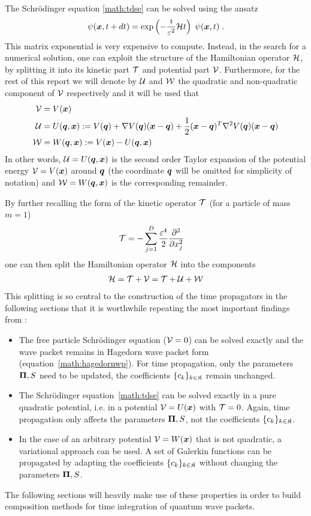 \par\medskip
%
The Schrödinger equation \ref{math:tdse} can be solved using the ansatz
\begin{align}
	\psi (\bm{x},t+dt) = \exp \left( - \frac{\imath}{\varepsilon^2} \mathcal{H} t \right) \; \psi (\bm{x},t) \; .
\end{align}
%
This matrix exponential is very expensive to compute.
Instead, in the search for a numerical solution, one can exploit the structure of the Hamiltonian operator $\mathcal{H}$, by splitting it into its kinetic part $\mathcal{T}$ and potential part $\mathcal{V}$.
Furthermore, for the rest of this report we will denote by $\mathcal{U}$ and $\mathcal{W}$ the quadratic and non-quadratic component of $\mathcal{V}$ respectively and it will be used that
%
\begin{align}
	\mathcal{V} &= V(\bm{x}) \\ 
	\mathcal{U} &= U(\bm{q},\bm{x}) := V(\bm{q}) + \nabla V(\bm{q}) (\bm{x}-\bm{q})
	+ \frac{1}{2} (\bm{x}-\bm{q})^T \nabla^2 V(\bm{q}) (\bm{x}-\bm{q}) \\
	\mathcal{W} &= W(\bm{q},\bm{x}) := V(\bm{x}) - U(\bm{q},\bm{x})
\end{align}
%
In other words, $\mathcal{U} = U(\bm{q},\bm{x})$ is the second order Taylor expansion of the potential energy $\mathcal{V} = V(\bm{x})$ around $\bm{q}$ (the coordinate $\bm{q}$ will be omitted for simplicity of notation) and $\mathcal{W} = W(\bm{q},\bm{x})$ is the corresponding remainder.
\par\medskip
%
By further recalling the form of the kinetic operator $\mathcal{T}$ (for a particle of mass $m=1$)
\begin{align}
	\mathcal{T} &= - \sum_{j=1}^D \frac{\varepsilon^4}{2} \frac{\partial^2}{\partial x_j^2}
\end{align}
%
one can then split the Hamiltonian operator $\mathcal{H}$ into the components
%
\begin{align}
	\mathcal{H} = \mathcal{T} + \mathcal{V} = \mathcal{T} + \mathcal{U} + \mathcal{W}
\end{align}
%
This splitting is so central to the construction of the time propagators in the following sections that it is worthwhile repeating the most important findings from \cite{FGL_semiclassical_dynamics}:
\begin{itemize}
	\item The free particle Schrödinger equation ($\mathcal{V}=0$) can be solved exactly and the wave packet remains in Hagedorn wave packet form (equation~\ref{math:hagedornwp}).
		For time propagation, only the parameters $\bm{\Pi},S$ need to be updated, the coefficients $\{c_k\}_{k \in \mathfrak{K}}$ remain unchanged.
	\item The Schrödinger equation~\ref{math:tdse} can be solved exactly in a pure quadratic potential, i.e. in a potential $\mathcal{V}=U(\bm{x})$ with $\mathcal{T}=0$.
		Again, time propagation only affects the parameters $\bm{\Pi},S$, not the coefficients $\{c_k\}_{k \in \mathfrak{K}}$.
	\item In the case of an arbitrary potential $\mathcal{V} = W(\bm{x})$ that is not quadratic, a variational approach can be used.
		A set of Galerkin functions can be propagated by adapting the coefficients $\{c_k\}_{k \in \mathfrak{K}}$ without changing the parameters $\bm{\Pi},S$.
\end{itemize}
%
The following sections will heavily make use of these properties in order to build composition methods for time integration of quantum wave packets.
